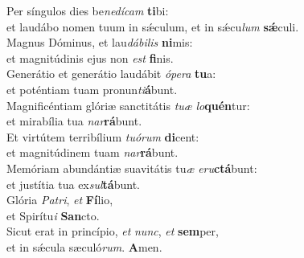\evenverse Per síngulos dies be\textit{ne}\textit{dí}\textit{cam} \textbf{ti}bi:~\*\\
\evenverse et laudábo nomen tuum in sǽculum, et in sǽcu\textit{lum} \textbf{sǽ}culi.\\
\oddverse Magnus Dóminus, et lau\textit{dá}\textit{bi}\textit{lis} \textbf{ni}mis:~\*\\
\oddverse et magnitúdinis ejus non \textit{est} \textbf{fi}nis.\\
\evenverse Generátio et generátio laudábit \textit{ó}\textit{pe}\textit{ra} \textbf{tu}a:~\*\\
\evenverse et poténtiam tuam pronun\textit{ti}\textbf{á}bunt.\\
\oddverse Magnificéntiam glóriæ sanctitátis \textit{tu}\textit{æ} \textit{lo}\textbf{quén}tur:~\*\\
\oddverse et mirabília tua \textit{nar}\textbf{rá}bunt.\\
\evenverse Et virtútem terribílium \textit{tu}\textit{ó}\textit{rum} \textbf{di}cent:~\*\\
\evenverse et magnitúdinem tuam \textit{nar}\textbf{rá}bunt.\\
\oddverse Memóriam abundántiæ suavitátis tu\textit{æ} \textit{e}\textit{ru}\textbf{ctá}bunt:~\*\\
\oddverse et justítia tua ex\textit{sul}\textbf{tá}bunt.\\
\evenverse Glória \textit{Pa}\textit{tri}, \textit{et} \textbf{Fí}lio,~\*\\
\evenverse et Spirítu\textit{i} \textbf{San}cto.\\
\oddverse Sicut erat in princípio, \textit{et} \textit{nunc}, \textit{et} \textbf{sem}per,~\*\\
\oddverse et in sǽcula sæculó\textit{rum}. \textbf{A}men.\\
